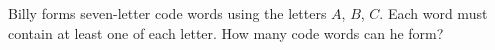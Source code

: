 Billy forms seven-letter code words using the letters $A$, $B$, $C$. Each word must contain at least one of each letter. How many code words can he form?
